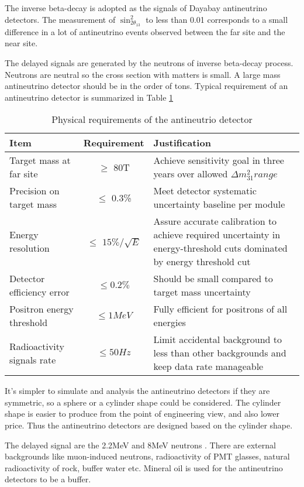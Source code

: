 The inverse beta-decay is adopted as the signals of Dayabay antineutrino detectors.
The measurement of $\sin^{2}_{2\theta_{13}}$ to less than 0.01 corresponds to a small
difference in a lot of antineutrino events observed between the far site and
the near site.

The delayed signals are generated by the neutrons of inverse beta-decay process.
Neutrons are neutral so the cross section with matters is small.
A large mass antineutrino detector should be in the order of tons.
Typical requirement of an antineutrino detector is summarized in Table \ref{tab:ADRequirement}


\begin{table}
\centering
\caption{Physical requirements of the antineutrio detector\cite{TDR}}
\label{tab:ADRequirement}
\begin{tabular}{lcp{5.0cm}}
\hline
Item & Requirement & Justification\\
\hline
\hline
Target mass at far site &
$\geq$ 80T &
Achieve sensitivity goal in three years over allowed ${\Delta}m^{2}_31 range$ \\
\hline
Precision on target mass &
$\leq$ 0.3\% &
Meet detector systematic uncertainty baseline per module \\
\hline
Energy resolution &
$\leq$ $15\%/\sqrt{E}$ &
Assure accurate calibration to achieve required uncertainty in energy-threshold cuts dominated by energy threshold cut \\
\hline
Detector efficiency error &
$\leq 0.2\%$ &
Should be small compared to target mass uncertainty \\
\hline
Positron energy threshold &
$\leq 1MeV$ &
Fully efficient for positrons of all energies \\
Radioactivity signals rate &
$\leq 50 Hz$ &
Limit accidental background to less than other backgrounds and keep data rate manageable \\
\hline
\end{tabular}
\end{table}


It's simpler to simulate and analysis the antineutrino detectors if they are
symmetric, so a sphere or a cylinder shape could be considered. The cylinder
shape is easier to produce from the point of engineering view, and also lower
price. Thus the antineutrino detectors are designed based on the cylinder shape.

The delayed signal are the 2.2MeV and 8MeV neutrons . There are external backgrounds like
muon-induced neutrons, radioactivity of PMT glasses, natural radioactivity of rock,
buffer water etc. Mineral oil is used for the antineutrino detectors to be a buffer.

